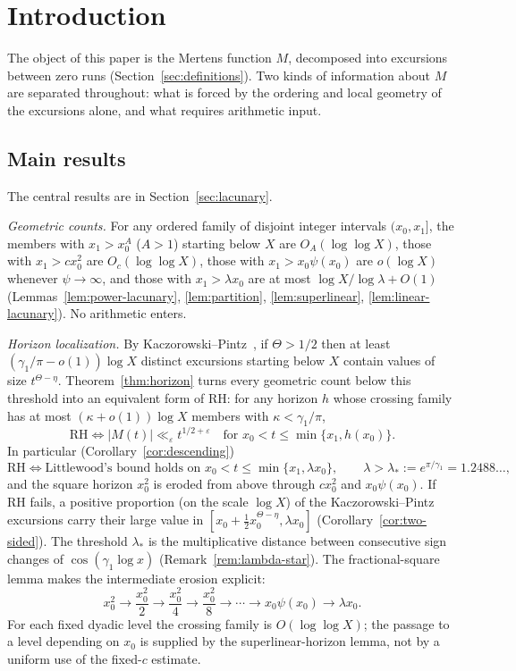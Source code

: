 \documentclass[11pt]{amsart}
\numberwithin{equation}{section}
\theoremstyle{plain}
\theoremstyle{definition}
\theoremstyle{remark}
\newcommand{\eps}{\varepsilon}
\begin{document}
\maketitle

\tableofcontents

\section{Introduction}
\label{sec:introduction}

The object of this paper is the Mertens function $M$, decomposed into
excursions between zero runs (Section~\ref{sec:definitions}). Two kinds of
information about $M$ are separated throughout: what is forced by the
ordering and local geometry of the excursions alone, and what requires
arithmetic input.

\subsection*{Main results}

The central results are in Section~\ref{sec:lacunary}.

\smallskip\noindent\emph{Geometric counts.} For any ordered family of
disjoint integer intervals $(x_{0},x_{1}]$, the members with $x_1>x_0^A$
($A>1$) starting below $X$ are $O_A(\log\log X)$, those with
$x_1>cx_0^2$ are $O_c(\log\log X)$, those with $x_1>x_0\psi(x_0)$ are
$o(\log X)$ whenever $\psi\to\infty$, and those with $x_1>\lambda x_0$ are at
most $\log X/\log\lambda+O(1)$ (Lemmas~\ref{lem:power-lacunary},
\ref{lem:partition}, \ref{lem:superlinear}, \ref{lem:linear-lacunary}). No
arithmetic enters.

\smallskip\noindent\emph{Horizon localization.} By
Kaczorowski--Pintz~\cite{KP86}, if $\Theta>1/2$ then at least
$(\gamma_1/\pi-o(1))\log X$ distinct excursions starting below $X$ contain
values of size $t^{\Theta-\eta}$. Theorem~\ref{thm:horizon} turns every
geometric count below this threshold into an equivalent form of RH: for any
horizon $h$ whose crossing family has at most $(\kappa+o(1))\log X$ members
with $\kappa<\gamma_1/\pi$,
\[
\mathrm{RH}\iff |M(t)|\ll_\eps t^{1/2+\eps}\quad\text{for }x_0<t\le\min\{x_1,h(x_0)\}.
\]
In particular (Corollary~\ref{cor:descending})
\[
\mathrm{RH}\iff\text{Littlewood's bound holds on }x_0<t\le\min\{x_1,\lambda x_0\},
\qquad\lambda>\lambda_*:=e^{\pi/\gamma_1}=1.2488\ldots,
\]
and the square horizon $x_0^2$ is eroded from above through $cx_0^2$ and
$x_0\psi(x_0)$. If RH fails, a positive proportion (on the scale $\log X$) of the
Kaczorowski--Pintz excursions carry their large value in
$[x_0+\frac12x_0^{\Theta-\eta},\lambda x_0]$ (Corollary~\ref{cor:two-sided}). The threshold $\lambda_*$ is the multiplicative distance
between consecutive sign changes of $\cos(\gamma_1\log x)$
(Remark~\ref{rem:lambda-star}).  The fractional-square lemma makes the
intermediate erosion explicit:
\[
x_0^2\longrightarrow \frac{x_0^2}{2}\longrightarrow
\frac{x_0^2}{4}\longrightarrow\frac{x_0^2}{8}\longrightarrow\cdots
\longrightarrow x_0\psi(x_0)\longrightarrow\lambda x_0.
\]
For each fixed dyadic level the crossing family is $O(\log\log X)$; the
passage to a level depending on $x_0$ is supplied by the superlinear-horizon
lemma, not by a uniform use of the fixed-$c$ estimate.
\end{document}
